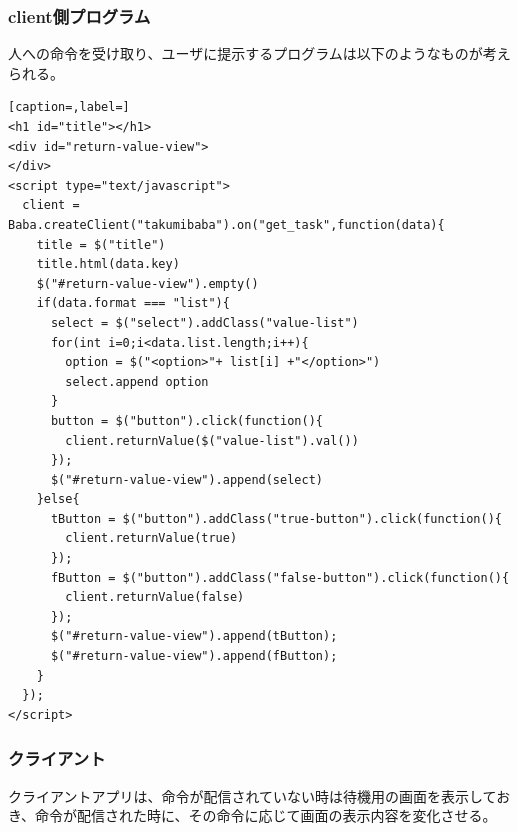 \documentclass{deimj}
\begin{document}
\subsubsection{client側プログラム}
人への命令を受け取り、ユーザに提示するプログラムは以下のようなものが考えられる。
\begin{lstlisting}[caption=,label=]
<h1 id="title"></h1>
<div id="return-value-view">
</div>
<script type="text/javascript">
  client = Baba.createClient("takumibaba").on("get_task",function(data){
    title = $("title")
    title.html(data.key)
    $("#return-value-view").empty()
    if(data.format === "list"){
      select = $("select").addClass("value-list")
      for(int i=0;i<data.list.length;i++){
        option = $("<option>"+ list[i] +"</option>")
        select.append option
      }
      button = $("button").click(function(){
        client.returnValue($("value-list").val())
      });
      $("#return-value-view").append(select)
    }else{
      tButton = $("button").addClass("true-button").click(function(){
        client.returnValue(true)
      });
      fButton = $("button").addClass("false-button").click(function(){
        client.returnValue(false)
      });
      $("#return-value-view").append(tButton);
      $("#return-value-view").append(fButton);
    }
  });
</script>
\end{lstlisting}
    
  
\subsubsection{クライアント}
クライアントアプリは、命令が配信されていない時は待機用の画面を表示しておき、命令が配信された時に、その命令に応じて画面の表示内容を変化させる。
\end{document}
